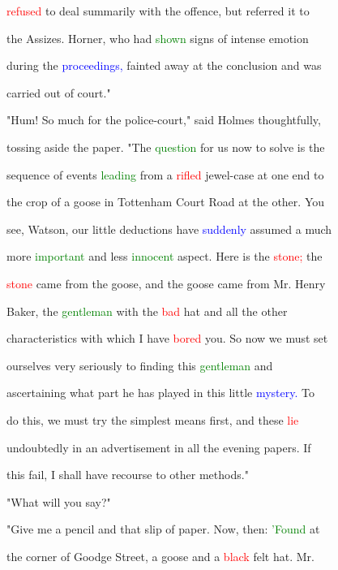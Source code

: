  \textcolor{red}{refused} to \textcolor{BurntOrange}{deal} summarily with the offence, but referred it to

 the Assizes. Horner, who had \textcolor{green}{shown} signs of \textcolor{BurntOrange}{intense} emotion

 during the \textcolor{blue}{proceedings,} fainted away at the conclusion and was

 carried out of \textcolor{BurntOrange}{court."}



 "Hum! So much for the police-court," said Holmes thoughtfully,

 tossing aside the paper. "The \textcolor{green}{question} for us now to solve is the

 sequence of events \textcolor{green}{leading} from a \textcolor{red}{rifled} jewel-case at one end to

 the crop of a goose in Tottenham \textcolor{BurntOrange}{Court} Road at the other. You

 see, Watson, our little deductions have \textcolor{blue}{suddenly} assumed a much

 more \textcolor{green}{important} and less \textcolor{green}{innocent} aspect. Here is the \textcolor{red}{stone;} the

 \textcolor{red}{stone} came from the goose, and the goose came from Mr. Henry

 Baker, the \textcolor{green}{gentleman} with the \textcolor{red}{bad} hat and all the other

 characteristics with which I have \textcolor{red}{bored} you. So now we must set

 ourselves very seriously to finding this \textcolor{green}{gentleman} and

 ascertaining what part he has played in this little \textcolor{blue}{mystery.} To

 do this, we must try the simplest means first, and these \textcolor{red}{lie}

 undoubtedly in an advertisement in all the evening papers. If

 this fail, I shall have recourse to other methods."



 "What will you say?"



 "Give me a pencil and that \textcolor{BurntOrange}{slip} of paper. Now, then: \textcolor{green}{'Found} at

 the corner of Goodge Street, a goose and a \textcolor{red}{black} felt hat. Mr.


